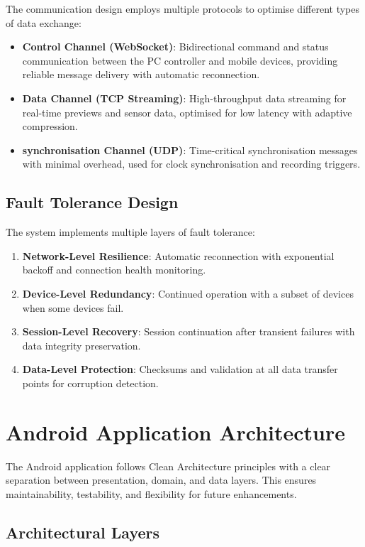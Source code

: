 \documentclass[11pt,a4paper]{report}
\begin{document}
The communication design employs multiple protocols to optimise different types of data exchange:
\begin{itemize}
  \item \textbf{Control Channel (WebSocket)}: Bidirectional command and status communication between the PC controller and mobile devices, providing reliable message delivery with automatic reconnection.
  \item \textbf{Data Channel (TCP Streaming)}: High-throughput data streaming for real-time previews and sensor data, optimised for low latency with adaptive compression.
  \item \textbf{synchronisation Channel (UDP)}: Time-critical synchronisation messages with minimal overhead, used for clock synchronisation and recording triggers.
\end{itemize}

\subsection{Fault Tolerance Design}

The system implements multiple layers of fault tolerance:
\begin{enumerate}
  \item \textbf{Network-Level Resilience}: Automatic reconnection with exponential backoff and connection health monitoring.
  \item \textbf{Device-Level Redundancy}: Continued operation with a subset of devices when some devices fail.
  \item \textbf{Session-Level Recovery}: Session continuation after transient failures with data integrity preservation.
  \item \textbf{Data-Level Protection}: Checksums and validation at all data transfer points for corruption detection.
\end{enumerate}

\section{Android Application Architecture}

The Android application follows Clean Architecture principles with a clear separation between presentation, domain, and data layers. This ensures maintainability, testability, and flexibility for future enhancements.

\subsection{Architectural Layers}
\end{document}

